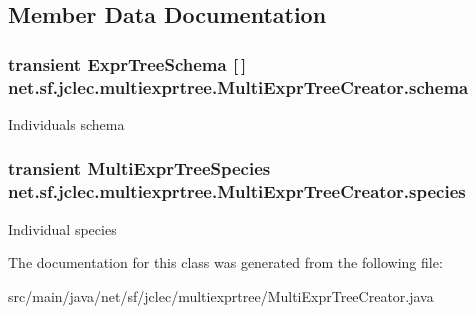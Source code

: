 \subsection{Member Data Documentation}
\hypertarget{classnet_1_1sf_1_1jclec_1_1multiexprtree_1_1_multi_expr_tree_creator_a2ad640f1e6647a60d99f689100229774}{
\subsubsection[{schema}]{\setlength{\rightskip}{0pt plus 5cm}transient {\bf Expr\-Tree\-Schema} \mbox{[}$\,$\mbox{]} net.\-sf.\-jclec.\-multiexprtree.\-Multi\-Expr\-Tree\-Creator.\-schema\hspace{0.3cm}{\ttfamily [protected]}}}\label{classnet_1_1sf_1_1jclec_1_1multiexprtree_1_1_multi_expr_tree_creator_a2ad640f1e6647a60d99f689100229774}
Individuals schema \hypertarget{classnet_1_1sf_1_1jclec_1_1multiexprtree_1_1_multi_expr_tree_creator_a50a976d9d51aab9b362bea1a311c7de5}{
\subsubsection[{species}]{\setlength{\rightskip}{0pt plus 5cm}transient {\bf Multi\-Expr\-Tree\-Species} net.\-sf.\-jclec.\-multiexprtree.\-Multi\-Expr\-Tree\-Creator.\-species\hspace{0.3cm}{\ttfamily [protected]}}}\label{classnet_1_1sf_1_1jclec_1_1multiexprtree_1_1_multi_expr_tree_creator_a50a976d9d51aab9b362bea1a311c7de5}
Individual species 

The documentation for this class was generated from the following file\-:\begin{DoxyCompactItemize}
\item 
src/main/java/net/sf/jclec/multiexprtree/Multi\-Expr\-Tree\-Creator.\-java\end{DoxyCompactItemize}
